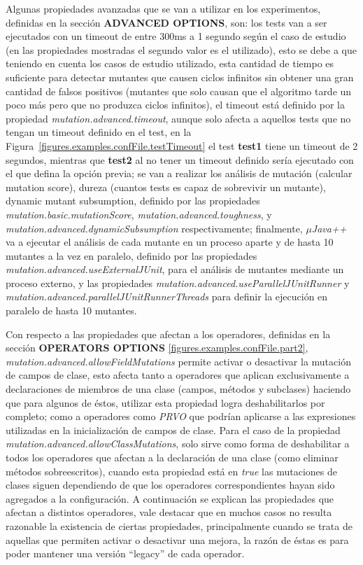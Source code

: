 Algunas propiedades avanzadas que se van a utilizar en los experimentos, definidas en la secci\'on \textbf{ADVANCED OPTIONS}, son: los tests van a ser ejecutados con un timeout de entre 300ms a 1 segundo seg\'un el caso de estudio (en las propiedades mostradas el segundo valor es el utilizado), esto se debe a que teniendo en cuenta los casos de estudio utilizado, esta cantidad de tiempo es suficiente para detectar mutantes que causen ciclos infinitos sin obtener una gran cantidad de falsos positivos (mutantes que solo causan que el algoritmo tarde un poco m\'as pero que no produzca ciclos infinitos), el timeout est\'a definido por la propiedad \emph{mutation.advanced.timeout}, aunque solo afecta a aquellos tests que no tengan un timeout definido en el test, en la Figura~\ref{figures.examples.confFile.testTimeout} el test \textbf{test1} tiene un timeout de 2 segundos, mientras que \textbf{test2} al no tener un timeout definido ser\'ia ejecutado con el que defina la opci\'on previa; se van a realizar los an\'alisis de mutaci\'on (calcular mutation score), dureza (cuantos tests es capaz de sobrevivir un mutante), dynamic mutant subsumption, definido por las propiedades \emph{mutation.basic.mutationScore}, \emph{mutation.advanced.toughness}, y \emph{mutation.advanced.dynamicSubsumption} respectivamente; finalmente, \emph{$\mu$Java++} va a ejecutar el an\'alisis de cada mutante en un proceso aparte y de hasta 10 mutantes a la vez en paralelo, definido por las propiedades \emph{mutation.advanced.useExternalJUnit}, para el an\'alisis de mutantes mediante un proceso externo, y las propiedades \emph{mutation.advanced.useParallelJUnitRunner} y \emph{mutation.advanced.parallelJUnitRunnerThreads} para definir la ejecuci\'on en paralelo de hasta 10 mutantes.

Con respecto a las propiedades que afectan a los operadores, definidas en la secci\'on \textbf{OPERATORS OPTIONS} \ref{figures.examples.confFile.part2}, \emph{mutation.advanced.allowFieldMutations} permite activar o desactivar la mutaci\'on de campos de clase, esto afecta tanto a operadores que aplican exclusivamente a declaraciones de miembros de una clase (campos, m\'etodos y subclases) haciendo que para algunos de \'estos, utilizar esta propiedad logra deshabilitarlos por completo; como a operadores como \emph{PRVO} que podr\'ian aplicarse a las expresiones utilizadas en la inicializaci\'on de campos de clase. Para el caso de la propiedad \emph{mutation.advanced.allowClassMutations}, solo sirve como forma de deshabilitar a todos los operadores que afectan a la declaraci\'on de una clase (como eliminar m\'etodos sobreescritos), cuando esta propiedad est\'a en \emph{true} las mutaciones de clases siguen dependiendo de que los operadores correspondientes hayan sido agregados a la configuraci\'on. A continuaci\'on se explican las propiedades que afectan a distintos operadores, vale destacar que en muchos casos no resulta razonable la existencia de ciertas propiedades, principalmente cuando se trata de aquellas que permiten activar o desactivar una mejora, la raz\'on de \'estas es para poder mantener una versi\'on ``legacy'' de cada operador.


